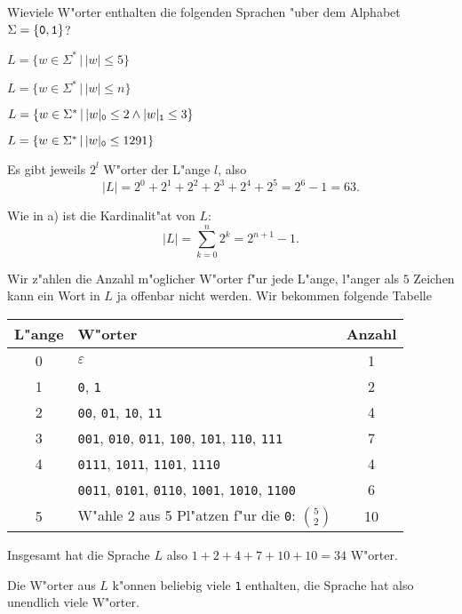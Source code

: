 Wieviele W"orter enthalten die folgenden Sprachen "uber dem Alphabet 
$\Sigma=\{{\tt 0}, {\tt 1}\}$?
\begin{teilaufgaben}
\item $L=\{ w\in\Sigma^*\,|\, |w|\le 5\}$
\item $L=\{ w\in\Sigma^*\,|\, |w|\le n\}$
\item $L=\{ w\in\Sigma^*\,|\,
|w|_{\tt 0}\le 2
\wedge
|w|_{\tt 1}\le 3
\}$
\item $L=\{ w\in\Sigma^*\,|\, |w|_{\tt 0}\le 1291\}$
\end{teilaufgaben}

\begin{loesung}
\begin{teilaufgaben}
\item
Es gibt jeweils $2^l$ W"orter der L"ange $l$, also
\[
|L|=2^0 + 2^1+2^2+2^3+2^4+2^5=2^6-1=63.
\]
\item
Wie in a) ist die Kardinalit"at von $L$:
\[
|L|=\sum_{k=0}^n2^k=2^{n+1}-1.
\]
\item
Wir z"ahlen die Anzahl m"oglicher W"orter f"ur jede L"ange, l"anger als
$5$ Zeichen kann ein Wort in $L$ ja offenbar nicht werden. Wir bekommen
folgende Tabelle
\begin{center}
\begin{tabular}{|c|l|c|}
\hline
L"ange&W"orter&Anzahl\\
\hline
0&$\varepsilon$&1\\
1&{\tt 0}, {\tt 1}&2\\
2&{\tt 00}, {\tt 01}, {\tt 10}, {\tt 11}&4\\
3&{\tt 001}, {\tt 010}, {\tt 011}, {\tt 100}, {\tt 101}, {\tt 110}, {\tt 111}&7\\
4&{\tt 0111}, {\tt 1011}, {\tt 1101}, {\tt 1110}&4\\
 &{\tt 0011}, {\tt 0101}, {\tt 0110}, {\tt 1001}, {\tt 1010}, {\tt 1100}&6\\
5&W"ahle 2 aus 5 Pl"atzen f"ur die {\tt 0}: $\binom{5}{2}$&10\\
\hline
\end{tabular}
\end{center}
Insgesamt hat die Sprache $L$ also $1+2+4+7+10+10=34$ W"orter.
\item Die W"orter aus $L$ k"onnen beliebig viele {\tt 1} enthalten,
die Sprache hat also unendlich viele W"orter.
\end{teilaufgaben}
\end{loesung}
